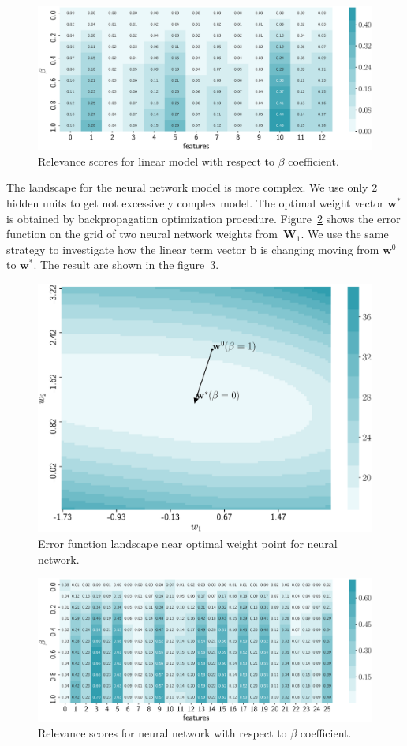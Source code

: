 \documentclass[a4paper,12pt]{article}
\theoremstyle{plain} %
\theoremstyle{definition} %
\theoremstyle{remark} %
\newcommand{\bb}{\mathbf{b}}
\newcommand{\bw}{\mathbf{w}}
\newcommand{\bW}{\mathbf{W}}
\begin{document}
	\begin{figure}[!h]	
		\centering
		\includegraphics[width=\linewidth]{figs/linear_b_wrt_beta.eps}	 
		\caption{Relevance scores for linear model with respect to $\beta$ coefficient.}
		\label{fig:linear_b_wrt_beta}
	\end{figure}

	The landscape for the neural network model is more complex. We use only 2 hidden units to get not excessively complex model.
	The optimal weight vector $\bw^*$ is obtained by backpropagation optimization procedure. 
	Figure~\ref{fig:neural_error} shows the error function on the grid of two neural network weights from~$\bW_1$. 
	We use the same strategy to investigate how the linear term vector $\bb$ is changing moving from $\bw^0$ to $\bw^*$. 
	The result are shown in the figure~\ref{fig:neural_b_wrt_beta}.
	

	\begin{figure}[!h]	
		\centering
		\includegraphics[width=0.8\linewidth]{figs/neural_error.eps}	 
		\caption{Error function landscape near optimal weight point for neural network.}
		\label{fig:neural_error}
	\end{figure}
	
	\begin{figure}[!h]	
		\centering
		\includegraphics[width=\linewidth]{figs/neural_b_wrt_beta.eps}	 
		\caption{Relevance scores for neural network with respect to $\beta$ coefficient.}
		\label{fig:neural_b_wrt_beta}
	\end{figure}
				
   \newpage
   \hrulefill
  
	
\end{document}
